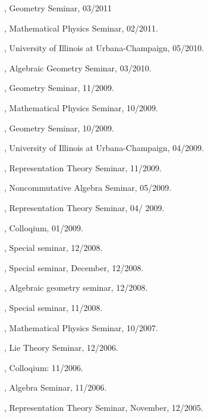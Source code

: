 \documentclass[11pt]{amsart}
\theoremstyle{plain}
\theoremstyle{definition}
\theoremstyle{remark}
\begin{document}
, Geometry Seminar, 03/2011

, Mathematical Physics Seminar, 02/2011.


,
University of Illinois at Urbana-Champaign,
05/2010.

, Algebraic Geometry Seminar,
03/2010.

, Geometry Seminar, 11/2009.

, Mathematical Physics Seminar,
10/2009.

, Geometry Seminar, 10/2009.

, University of Illinois at Urbana-Champaign,
04/2009.


, Representation Theory Seminar, 11/2009.

, Noncommutative Algebra Seminar, 05/2009.

, Representation Theory Seminar, 04/ 2009.



, Colloqium, 01/2009.

, Special seminar, 12/2008.

, Special seminar, December, 12/2008.

, Algebraic geometry seminar, 12/2008.

, Special seminar, 11/2008.




, Mathematical
Physics Seminar, 10/2007.

, Lie Theory
Seminar, 12/2006.

, Colloqium:
11/2006.

, Algebra
Seminar, 11/2006.

,
Representation Theory Seminar, November, 12/2005.
\end{document}
